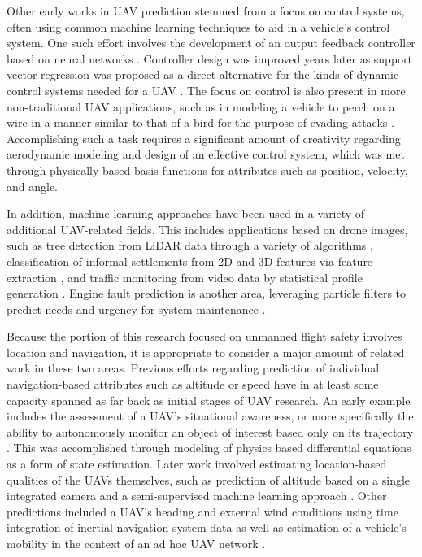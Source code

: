 \documentclass[12pt]{uthesis-v12}  %
\begin{document}
Other early works in UAV prediction stemmed from a focus on control systems, often using common machine learning techniques to aid in a vehicle's control system.
One such effort involves the development of an output feedback controller based on neural networks \cite{dierks}.
Controller design was improved years later as support vector regression was proposed as a direct alternative for the kinds of dynamic control systems needed for a UAV \cite{shin}.
The focus on control is also present in more non-traditional UAV applications, such as in modeling a vehicle to perch on a wire in a manner similar to that of a bird for the purpose of evading attacks \cite{hoburg}.
Accomplishing such a task requires a significant amount of creativity regarding aerodynamic modeling and design of an effective control system, which was met through physically-based basis functions for attributes such as position, velocity, and angle.

In addition, machine learning approaches have been used in a variety of additional UAV-related fields. 
This includes applications based on drone images, such as tree detection from LiDAR data through a variety of algorithms \cite{wallace}, classification of informal settlements from 2D and 3D features via feature extraction \cite{gevaert}, and traffic monitoring from video data by statistical profile generation \cite{puri}. Engine fault prediction is another area, leveraging particle filters to predict needs and urgency for system maintenance \cite{baoan}.

Because the portion of this research focused on unmanned flight safety involves location and navigation, it is appropriate to consider a major amount of related work in these two areas. 
Previous efforts regarding prediction of individual navigation-based attributes such as altitude or speed have in at least some capacity spanned as far back as initial stages of UAV research.
An early example includes the assessment of a UAV's situational awareness, or more specifically the ability to autonomously monitor an object of interest based only on its trajectory \cite{jaen}.
This was accomplished through modeling of physics based differential equations as a form of state estimation.
Later work involved estimating location-based qualities of the UAVs themselves, such as prediction of altitude based on a single integrated camera and a semi-supervised machine learning approach \cite{cherian}. 
Other predictions included a UAV's heading and external wind conditions using time integration of inertial navigation system data \cite{rhudy} as well as estimation of a vehicle's mobility in the context of an ad hoc UAV network \cite{lin}.
\end{document}
